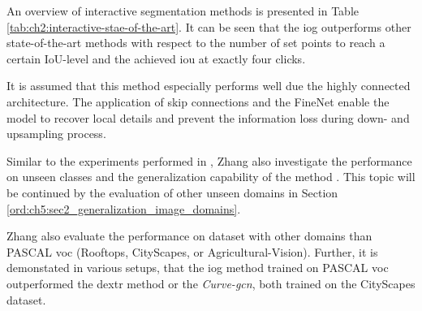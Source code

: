 An overview of interactive segmentation methods is presented in Table \ref{tab:ch2:interactive-stae-of-the-art}.
It can be seen that the \gls{iog} outperforms other state-of-the-art methods with respect to the number of set points to reach a certain IoU-level and the achieved \gls{iou} at exactly four clicks.

It is assumed that this method especially performs well due the highly connected architecture.
The application of skip connections and the FineNet enable the model to recover local details and prevent the information loss during down- and upsampling process.

Similar to the experiments performed in \cite{Man18-DEXTR}, Zhang \etal also investigate the performance on unseen classes and the generalization capability of the method \Cite{Zha20-IOG}. 
This topic will be continued by the evaluation of other unseen domains in Section \ref{ord:ch5:sec2_generalization_image_domains}.

Zhang \etal also evaluate the performance on dataset with other domains than PASCAL \gls{voc} (\eg Rooftops, CityScapes, or Agricultural-Vision).
Further, it is demonstated in various setups, that the \gls{iog} method trained on PASCAL \gls{voc} outperformed the \gls{dextr} method or the \textit{Curve-\gls{gcn}}, both trained on the CityScapes dataset.

